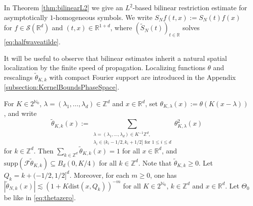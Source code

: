 \documentclass{amsart}
\numberwithin{equation}{section}
\theoremstyle{definition}
\newcommand{\R}{\mathbb{R}}
\newcommand{\Rd}{\mathbb{R}^{d}}
\newcommand{\N}{\mathbb{N}}
\newcommand{\Z}{\mathbb{Z}}
\newcommand{\F}{\mathcal{F}}
\newcommand {\la}{\lambda}
\newcommand {\Sw}{\mathcal{S}}
\newcommand {\supp}{\mathrm{supp}}
\begin{document}
In Theorem \ref{thm:bilinearL2} we give an $L^{2}$-based bilinear restriction estimate for asymptotically $1$-homogeneous symbols. We write $S_{N}f(t,x):=S_{N}(t)f(x)$ for $f\in\Sw(\Rd)$ and $(t,x)\in\R^{1+d}$, where  $(\tilde{S}_N(t))_{t\in\R}$ solves \eqref{eq:halfwaveatilde}. 

It will be useful to observe that bilinear estimates inherit a natural spatial localization by the finite speed of propagation. Localizing functions $\theta$ and rescalings $\tilde{\theta}_{K,k}$ with compact Fourier support are introduced in the Appendix \ref{subsection:KernelBoundsPhaseSpace}.

For $K \in 2^{\N_{0}}$, $\lambda=(\lambda_{1},\ldots,\lambda_{d})\in \Z^{d}$ and $x\in\Rd$, set $\theta_{K,\lambda}(x) := \theta(K(x-\lambda))$, and write %
\begin{equation*}
\tilde{\theta}_{K,k}(x) := \sum_{\substack{\la=(\la_{1},\ldots,\la_{d}) \in K^{-1} \Z^d, \\ \la_i \in (k_i-1/2,k_i+1/2]\text{ for }1\leq i\leq d}} \theta_{K,\lambda}^2(x)
\end{equation*}
for $k \in\Z^{d}$. Then 
$\sum_{k \in \Z^d} \tilde{\theta}_{K,k}(x)=1$ 
for all $x\in\Rd$, and $\supp(\F\tilde{\theta}_{K,k})\subseteq B_{d}(0,K/4)$ for all $k \in \Z^{d}$. Note that $\tilde{\theta}_{K,k} \geq 0$. Let $Q_{k} = k + (-1/2,1/2]^d$.
Moreover, for each $m\geq 0$, one has $|\tilde{\theta}_{N,k}(x)|\lesssim (1+K \text{dist}(x,Q_k))^{-m}$ for all $K \in 2^{\N_{0}}$, $k \in\Z^{d}$ and $x\in\Rd$. Let $\Theta_0$ be like in \eqref{eq:thetazero}.
\end{document}
